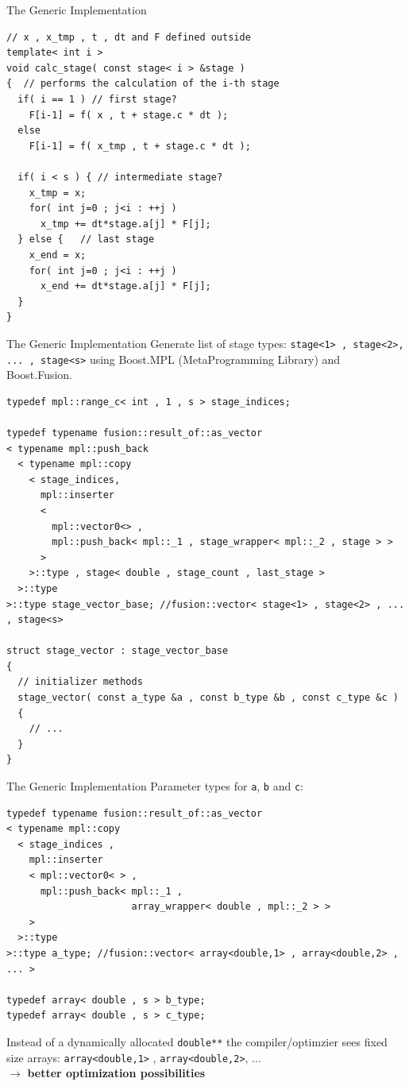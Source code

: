 \documentclass{beamer}
\begin{document}
\begin{frame}[fragile]{The Generic Implementation}
\begin{lstlisting}
// x , x_tmp , t , dt and F defined outside
template< int i >
void calc_stage( const stage< i > &stage )
{  // performs the calculation of the i-th stage
  if( i == 1 ) // first stage?
    F[i-1] = f( x , t + stage.c * dt );
  else
    F[i-1] = f( x_tmp , t + stage.c * dt );

  if( i < s ) { // intermediate stage?
    x_tmp = x;
    for( int j=0 ; j<i : ++j )
      x_tmp += dt*stage.a[j] * F[j];
  } else {   // last stage
    x_end = x;
    for( int j=0 ; j<i : ++j )
      x_end += dt*stage.a[j] * F[j];
  }
}
\end{lstlisting}
\end{frame}

\begin{frame}[fragile]{The Generic Implementation}
Generate list of stage types: \lstinline+stage<1> , stage<2>, ... , stage<s>+ using Boost.MPL (MetaProgramming Library) and Boost.Fusion.

\begin{lstlisting}[basicstyle=\ttfamily\tiny]
typedef mpl::range_c< int , 1 , s > stage_indices;

typedef typename fusion::result_of::as_vector
< typename mpl::push_back
  < typename mpl::copy
    < stage_indices,
      mpl::inserter
      <
        mpl::vector0<> ,
        mpl::push_back< mpl::_1 , stage_wrapper< mpl::_2 , stage > >
      >
    >::type , stage< double , stage_count , last_stage >
  >::type
>::type stage_vector_base; //fusion::vector< stage<1> , stage<2> , ... , stage<s>

struct stage_vector : stage_vector_base
{
  // initializer methods
  stage_vector( const a_type &a , const b_type &b , const c_type &c )
  {
    // ...
  }
}
\end{lstlisting}

\end{frame}

\begin{frame}[fragile]{The Generic Implementation}
Parameter types for \lstinline+a+, \lstinline+b+ and \lstinline+c+:
\begin{lstlisting}[basicstyle=\ttfamily\tiny]
typedef typename fusion::result_of::as_vector
< typename mpl::copy
  < stage_indices ,
    mpl::inserter
    < mpl::vector0< > ,
      mpl::push_back< mpl::_1 , 
                      array_wrapper< double , mpl::_2 > >
    >
  >::type
>::type a_type; //fusion::vector< array<double,1> , array<double,2> , ... >

typedef array< double , s > b_type;
typedef array< double , s > c_type;
\end{lstlisting}

\pause
Instead of a dynamically allocated \lstinline+double**+ the compiler/optimzier sees fixed size arrays: \lstinline+array<double,1>+ , \lstinline+array<double,2>+, ... \\
$\longrightarrow$ \textbf{better optimization possibilities}
\end{frame}
\end{document}
